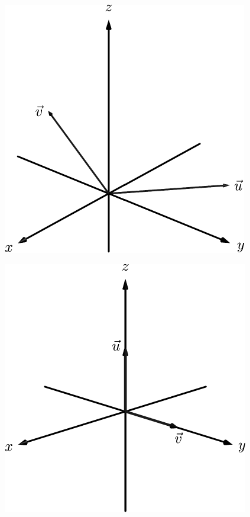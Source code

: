\documentclass[10pt]{article}
\begin{document}
\includegraphics{fig10_02_ex_14_3DBW.pdf}
\texttt{}

\includegraphics{fig10_02_ex_15_3DBW.pdf}
\texttt{}
\end{document}
